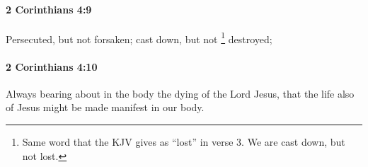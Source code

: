 		\paragraph{2 Corinthians 4:9} %
			\label{2CORINTHIANS-4-9}

			Persecuted, but not forsaken; cast down, but not
				\footnote{%
					Same word that the KJV gives as ``lost'' in verse 3. We are cast down, but not lost.
					}%
			destroyed;

			\begin{framed}
			\scriptsize
				\begin{compactdesc}
					\item[SBLG] 
				\end{compactdesc}
			\end{framed}

		\paragraph{2 Corinthians 4:10} %
			\label{2CORINTHIANS-4-10}

			Always bearing about in the body the dying of the Lord Jesus, that the life also of Jesus might be made manifest in our body.


